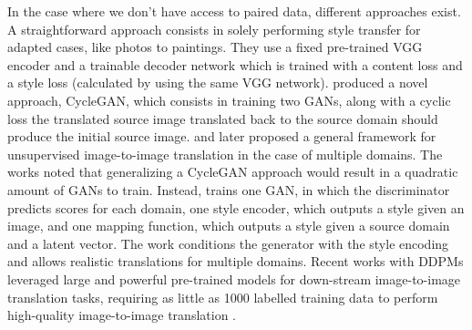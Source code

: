 In the case where we don't have access to paired data, different approaches exist. 
A straightforward approach consists in solely performing style transfer \citep{huang2017arbitrary}
for adapted cases, like photos to paintings. They use a fixed pre-trained VGG encoder \citep{simonyan2014very}
and a trainable decoder network which is trained with a content loss and a style loss (calculated by using 
the same VGG network). \cite{cyclegan} produced a novel approach, CycleGAN, which consists in training two \ac{GAN}s, 
along with a cyclic loss the translated source image translated back to the source domain should produce the 
initial source image.  \cite{choi2018stargan} and later \cite{choi2020stargan}
proposed a general framework for unsupervised image-to-image translation in the case of multiple domains. The works 
noted that generalizing a CycleGAN approach  would result in a quadratic amount of \ac{GAN}s to train.
Instead, \cite{choi2020stargan} trains one \ac{GAN}, in which the discriminator predicts scores for each domain, 
one style encoder, which outputs a style given an image, and one mapping function, which outputs a style given 
a source domain and a latent vector. The work conditions the generator with the style encoding
and allows realistic translations for multiple domains. Recent works with \ac{DDPM}s leveraged large and powerful 
pre-trained models for down-stream image-to-image translation tasks, requiring as little as 1000 labelled 
training data to perform high-quality image-to-image translation \citep{zhang2023adding, wang2022pretraining, voynov2022sketch}.

